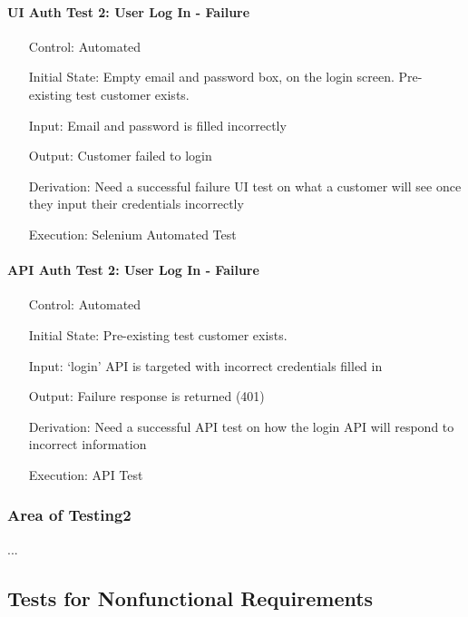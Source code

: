 \documentclass[12pt, titlepage]{article}
\begin{document}
\paragraph*{UI Auth Test 2: User Log In - Failure}
\begin{itemize}
	\item[Control:] Automated
	\item[Initial State:] Empty email and password box, on the login screen. Pre-existing test customer exists. 
	\item[Input:] Email and password is filled incorrectly
	\item[Output:] Customer failed to login
	\item[Derivation:] Need a successful failure UI test on what a customer will see once they input their credentials incorrectly
	\item[Execution:] Selenium Automated Test
\end{itemize}

\paragraph*{API Auth Test 2: User Log In - Failure}
\begin{itemize}
	\item[Control:] Automated
	\item[Initial State:] Pre-existing test customer exists. 
	\item[Input:] `login' API is targeted with incorrect credentials filled in
	\item[Output:] Failure response is returned (401)
	\item[Derivation:] Need a successful API test on how the login API will respond to incorrect information
	\item[Execution:] API Test
\end{itemize}

\subsubsection{Area of Testing2}

...

\subsection{Tests for Nonfunctional Requirements}

\end{document}
